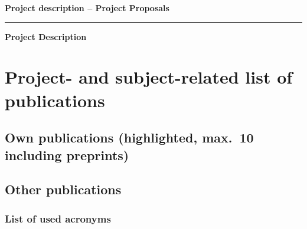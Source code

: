 \documentclass[11pt,DIV=16,parskip=half]{scrartcl}
\begin{document}
\textbf{Project description -- Project Proposals}
\vspace{2em}

\textbf{\theApplicants}
\vspace{1em}

\textbf{\thetitle}

\vspace{1em}
\hrule
\vspace{1em}

\textbf{\Large Project Description}







\section{Project- and subject-related list of publications}

\subsection*{Own publications (highlighted, max.\ 10 including preprints)}
\printbibliography[keyword=own,heading=none,resetnumbers=true]
\printbibliography[keyword=ownpreprint,heading=none,resetnumbers=true]

\subsection*{Other publications}
\resetboldbibnames
\newrefcontext
{}
\printbibliography[heading=none,notkeyword=own,notkeyword=ownpreprint,resetnumbers=true]



\subsubsection{List of used acronyms}




\end{document}
